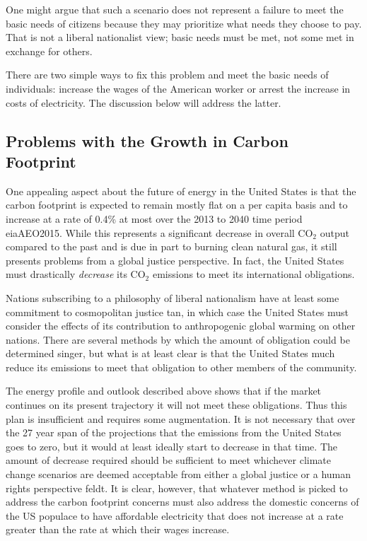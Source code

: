 One might argue that such a scenario does not represent a failure to meet the 
basic needs of citizens because they may prioritize what needs they choose to 
pay. That is not a liberal nationalist view; basic needs must be met, not some 
met in exchange for others.

There are two simple ways to fix this problem and meet the basic needs of 
individuals: increase the wages of the American worker or arrest the increase in
costs of electricity. The discussion below will address the latter.

\subsection{Problems with the Growth in Carbon Footprint}

One appealing aspect about the future of energy in the United States is that the
carbon footprint is expected to remain mostly flat on a per capita basis and to 
increase at a rate of 0.4\% at most over the 2013 to 2040 time period
\cite{jay}{eiaAEO2015}. While this represents a significant decrease in overall CO$_2$
output compared to the past and is due in part to burning clean natural gas, it
still presents problems from a global justice perspective. In fact, the United 
States must drastically \textit{decrease} its CO$_2$ emissions to meet its 
international obligations.

Nations subscribing to a philosophy of liberal nationalism have at least some 
commitment to cosmopolitan justice \cite{jay}{tan}, in which case the United States 
must consider the effects of its contribution to anthropogenic global warming 
on other nations. There are several methods by which the amount of obligation 
could be determined \cite{jay}{singer}, but what is at least clear is that the United
States much reduce its emissions to meet that obligation to other members of the
community.

The energy profile and outlook described above shows that if the market 
continues on its present trajectory it will not meet these obligations. Thus 
this plan is insufficient and requires some augmentation. It is not necessary 
that over the 27 year span of the projections that the emissions from the 
United States goes to zero, but it would at least ideally start to decrease in
that time. The amount of decrease required should be sufficient to meet 
whichever climate change scenarios are deemed acceptable from either a global 
justice or a human rights perspective \cite{jay}{feldt}. It is clear, however, that 
whatever method is picked to address the carbon footprint concerns must also 
address the domestic concerns of the US populace to have affordable electricity 
that does not increase at a rate greater than the rate at which their wages 
increase.

